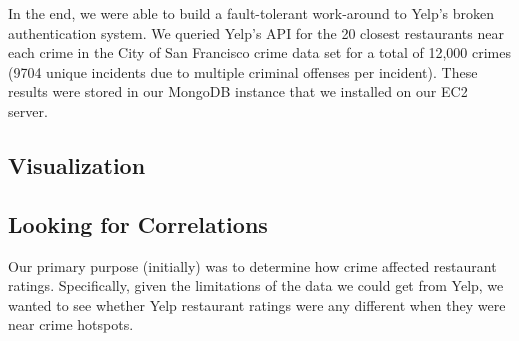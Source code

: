 \documentclass{article}
\begin{document}
In the end, we were able to build a fault-tolerant work-around to Yelp's
broken authentication system. We queried Yelp's API for the 20 closest
restaurants near each crime in the City of San Francisco crime data set for
a total of 12,000 crimes (9704 unique incidents due to multiple criminal
offenses per incident). These results were stored in our MongoDB instance
that we installed on our EC2 server.

\subsection{Visualization}


\subsection{Looking for Correlations}

Our primary purpose (initially) was to determine how crime affected
restaurant ratings. Specifically, given the limitations of the data we
could get from Yelp, we wanted to see whether Yelp restaurant ratings were
any different when they were near crime hotspots.
\end{document}
